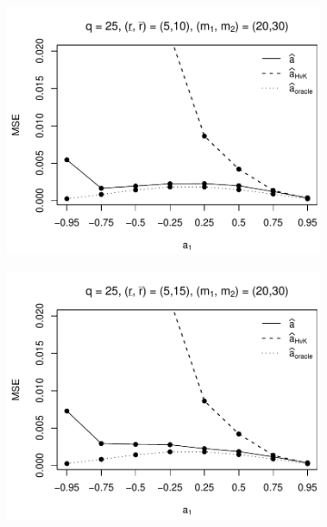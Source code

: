 \begin{figure}[p]
\begin{subfigure}[b]{0.45\textwidth}
\includegraphics[width=\textwidth]{Plots/Plots_Supplement/MSE_a_zoom_T=500_slope=10_(L1,L2,K1,K2,M1,M2)=(25,25,5,10,20,30).pdf}
\end{subfigure}
\hspace{0.25cm}
\begin{subfigure}[b]{0.45\textwidth}
\includegraphics[width=\textwidth]{Plots/Plots_Supplement/MSE_a_zoom_T=500_slope=10_(L1,L2,K1,K2,M1,M2)=(25,25,5,15,20,30).pdf}
\end{subfigure}


\end{figure}
